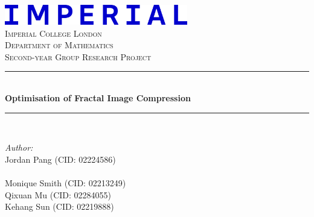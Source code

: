 \documentclass[a4paper,11pt, titlepage]{article}
\theoremstyle{definition}
\theoremstyle{plain}
\theoremstyle{remark}
\theoremstyle{definition}
\newcommand{\reporttitle}{Optimisation of Fractal Image Compression} %
\newcommand{\reportauthorA}{Jordan Pang (CID: 02224586)} %
\newcommand{\reportauthorC}{Monique Smith (CID: 02213249)} %
\newcommand{\reportauthorD}{Qixuan Mu (CID: 02284055)} %
\newcommand{\reportauthorE}{Kehang Sun (CID: 02219888)} %
\begin{document}
\begin{titlepage}
\newcommand{\HRule}{\rule{\linewidth}{0.5mm}} %
\includegraphics[width=8cm]{Imperial_logo.png}\\[1cm] %
\center %
\textsc{\LARGE Imperial College London}\\[0.5cm] 
\textsc{\Large Department of Mathematics}\\[1.5cm] 
\textsc{\Large Second-year Group Research Project}\\[0.5cm]
\makeatletter
\HRule \\[0.6cm]
{ \huge \bfseries \reporttitle}\\[0.6cm] %
\HRule \\[1.5cm]
\begin{minipage}{0.4\textwidth}
\begin{flushleft} \large
\emph{Author:}\\
\reportauthorA \\
\reportauthorB \\
\reportauthorC \\
\reportauthorD \\
\reportauthorE
\end{flushleft}
\end{minipage}

\end{titlepage}
\end{document}
